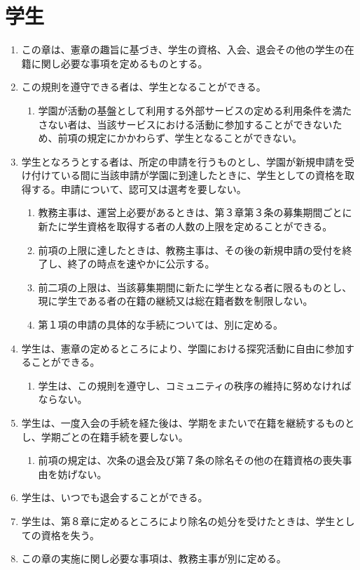 \newpage
\chapter{学生}
\begin{enumerate}[label=第\arabic*条　]
  \item この章は、憲章の趣旨に基づき、学生の資格、入会、退会その他の学生の在籍に関し必要な事項を定めるものとする。
  \item この規則を遵守できる者は、学生となることができる。
    \begin{enumerate}[label=\arabic*　,start=2,leftmargin=*]
      \item 学園が活動の基盤として利用する外部サービスの定める利用条件を満たさない者は、当該サービスにおける活動に参加することができないため、前項の規定にかかわらず、学生となることができない。
    \end{enumerate}
  \item 学生となろうとする者は、所定の申請を行うものとし、学園が新規申請を受け付けている間に当該申請が学園に到達したときに、学生としての資格を取得する。申請について、認可又は選考を要しない。
    \begin{enumerate}[label=\arabic*　,start=2,leftmargin=*]
      \item 教務主事は、運営上必要があるときは、第３章第３条の募集期間ごとに新たに学生資格を取得する者の人数の上限を定めることができる。
      \item 前項の上限に達したときは、教務主事は、その後の新規申請の受付を終了し、終了の時点を速やかに公示する。
      \item 前二項の上限は、当該募集期間に新たに学生となる者に限るものとし、現に学生である者の在籍の継続又は総在籍者数を制限しない。
      \item 第１項の申請の具体的な手続については、別に定める。
    \end{enumerate}
  \item 学生は、憲章の定めるところにより、学園における探究活動に自由に参加することができる。
    \begin{enumerate}[label=\arabic*　,start=2,leftmargin=*]
      \item 学生は、この規則を遵守し、コミュニティの秩序の維持に努めなければならない。
    \end{enumerate}
  \item 学生は、一度入会の手続を経た後は、学期をまたいで在籍を継続するものとし、学期ごとの在籍手続を要しない。
    \begin{enumerate}[label=\arabic*　,start=2,leftmargin=*]
      \item 前項の規定は、次条の退会及び第７条の除名その他の在籍資格の喪失事由を妨げない。
    \end{enumerate}
  \item 学生は、いつでも退会することができる。
  \item 学生は、第８章に定めるところにより除名の処分を受けたときは、学生としての資格を失う。
  \item この章の実施に関し必要な事項は、教務主事が別に定める。
\end{enumerate}
